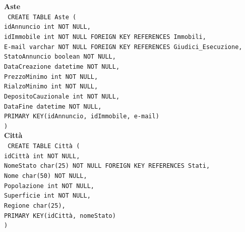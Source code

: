 \documentclass[a4paper,12pt]{report}
\begin{document}
                \noindent
                {\large \textbf{Aste}} \\
                \texttt{
                    CREATE TABLE Aste ( \\
                    \null\quad\quad idAnnuncio          int         NOT NULL, \\
                    \null\quad\quad idImmobile int NOT NULL FOREIGN KEY REFERENCES Immobili, \\
                    \null\quad\quad E-mail varchar NOT NULL FOREIGN KEY REFERENCES Giudici\_Esecuzione, \\
                    \null\quad\quad StatoAnnuncio       boolean     NOT NULL, \\
                    \null\quad\quad DataCreazione       datetime    NOT NULL, \\
                    \null\quad\quad PrezzoMinimo        int         NOT NULL, \\
                    \null\quad\quad RialzoMinimo        int         NOT NULL, \\
                    \null\quad\quad DepositoCauzionale  int         NOT NULL, \\
                    \null\quad\quad DataFine            datetime    NOT NULL, \\
                    \null\quad\quad PRIMARY KEY(idAnnuncio, idImmobile, e-mail) \\
                    )
                } \\

                \noindent
                {\large \textbf{Città}} \\
                \texttt{
                    CREATE TABLE Città ( \\
                    \null\quad\quad idCittà         int         NOT NULL, \\
                    \null\quad\quad NomeStato char(25) NOT NULL FOREIGN KEY REFERENCES Stati, \\
                    \null\quad\quad Nome            char(50)    NOT NULL, \\
                    \null\quad\quad Popolazione     int         NOT NULL, \\
                    \null\quad\quad Superficie      int         NOT NULL, \\
                    \null\quad\quad Regione         char(25), \\
                    \null\quad\quad PRIMARY KEY(idCittà, nomeStato) \\
                    )
                } \\
\end{document}
